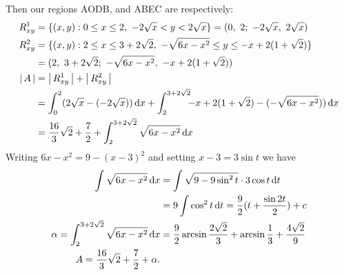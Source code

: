 \documentclass[11pt]{amsbook}
\begin{document}
Then our regions AODB, and ABEC are respectively:
\begin{align*}
	R_{xy}^{1} &= 
		\{ (x, y): 
		0 \leq x \leq 2,
		\ -2\sqrt{x} < y < 2\sqrt{x} \} 
		= (0,\ 2;
		\ -2\sqrt{x},\ 2\sqrt{x})  \\
	R_{xy}^{2} &= 
		\{ (x, y): 
		2 \leq x \leq 3+2\sqrt{2},
		\ -\sqrt{6x-x^{2}} \leq y \leq -x+2(1+\sqrt{2})\} \\
		& = (2,\ 3+2\sqrt{2};
		\ -\sqrt{6x-x^{2}},\ -x+2(1+\sqrt{2})) \\
	\left \lvert \, A \, \right \rvert & = 
		\left \lvert \, R_{xy}^{1} \, \right \rvert+\left \lvert \, R_{xy}^{2} \, \right \rvert \\
	& = \int_{0}^{2} 
		(2\sqrt{x}-(-2\sqrt{x})) \, \mathrm{d} x 
		+\int_{2}^{3+2\sqrt{2}} 
			\!\!\! -x+2(1+\sqrt{2})-(-\sqrt{6x-x^{2}})) \, \mathrm{d} x \\
	& = \frac{16}{3} \sqrt{2} 
		+ \frac{7}{2} 
		+ \int_{2}^{3+2\sqrt{2}} 
			\sqrt{6x-x^{2}} \, \mathrm{d} x
\end{align*}
Writing $6x-x^{2}=9-(x-3)^{2}$ and setting $x-3=3\sin t$ we have
\begin{align*}
	\int \sqrt{6x-x^{2}} \, \mathrm{d} x 
	&= \int 
		\sqrt{9-9 \sin^{2} t} \cdot 3 \cos t \, \mathrm{d} t \\
	& = 9 \int 
		\cos^{2} t \, \mathrm{d} t 
	= \frac{9}{2} (t+ \frac{\sin 2t}{2}) + c \\
	\alpha = 
		\int_{2}^{3+2\sqrt{2}} 
			\sqrt{6x-x^{2}} \, \mathrm{d} x
	&= \frac{9}{2} \arcsin \frac{2 \sqrt{2}}{3} 
		+ \arcsin \frac{1}{3} + \frac{4 \sqrt{2}}{9}\\
	A = \frac{16}{3} \sqrt{2} + \frac{7}{2} + \alpha .
\end{align*}
\end{document}
